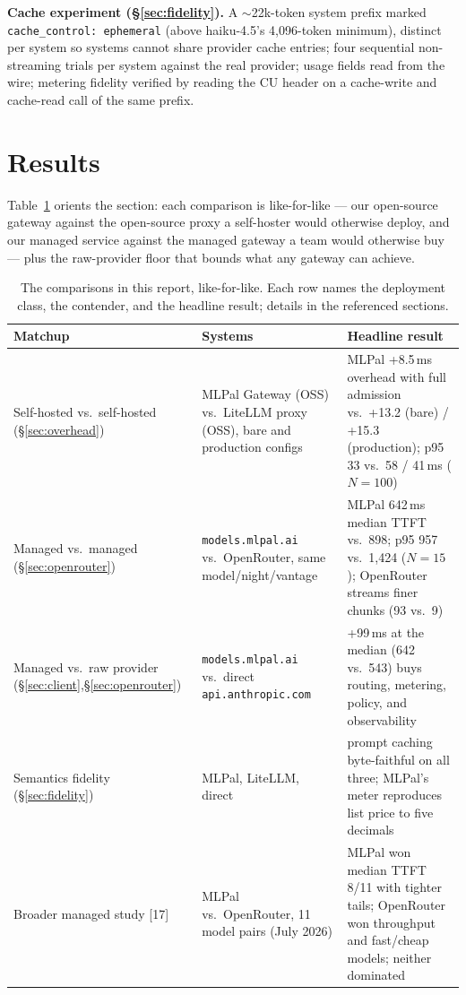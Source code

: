 \documentclass[10pt]{article}
\newcommand{\head}[1]{\textbf{#1}}
\begin{document}
\head{Cache experiment (\S\ref{sec:fidelity}).} A $\sim$22k-token system prefix marked \texttt{cache\_control: ephemeral} (above haiku-4.5's 4{,}096-token minimum), distinct per system so systems cannot share provider cache entries; four sequential non-streaming trials per system against the real provider; usage fields read from the wire; metering fidelity verified by reading the CU header on a cache-write and cache-read call of the same prefix.

\section{Results}
Table~\ref{tab:matchups} orients the section: each comparison is like-for-like --- our open-source gateway against the open-source proxy a self-hoster would otherwise deploy, and our managed service against the managed gateway a team would otherwise buy --- plus the raw-provider floor that bounds what any gateway can achieve.

\begin{table}[t]
\centering\small
\caption{The comparisons in this report, like-for-like. Each row names the deployment class, the contender, and the headline result; details in the referenced sections.}
\label{tab:matchups}
\setlength{\tabcolsep}{4pt}
\begin{tabular}{p{2.9cm}p{3.3cm}p{6.4cm}}
\toprule
Matchup & Systems & Headline result \\
\midrule
Self-hosted vs.\ self-hosted (\S\ref{sec:overhead}) & MLPal Gateway (OSS) vs.\ LiteLLM proxy (OSS), bare and production configs & MLPal +8.5\,ms overhead with full admission vs.\ +13.2 (bare) / +15.3 (production); p95 33 vs.\ 58 / 41\,ms ($N{=}100$) \\[2pt]
Managed vs.\ managed (\S\ref{sec:openrouter}) & \texttt{models.mlpal.ai} vs.\ OpenRouter, same model/night/vantage & MLPal 642\,ms median TTFT vs.\ 898; p95 957 vs.\ 1{,}424 ($N{=}15$); OpenRouter streams finer chunks (93 vs.\ 9) \\[2pt]
Managed vs.\ raw provider (\S\ref{sec:client},\S\ref{sec:openrouter}) & \texttt{models.mlpal.ai} vs.\ direct \texttt{api.anthropic.com} & +99\,ms at the median (642 vs.\ 543) buys routing, metering, policy, and observability \\[2pt]
Semantics fidelity (\S\ref{sec:fidelity}) & MLPal, LiteLLM, direct & prompt caching byte-faithful on all three; MLPal's meter reproduces list price to five decimals \\[2pt]
Broader managed study [17] & MLPal vs.\ OpenRouter, 11 model pairs (July 2026) & MLPal won median TTFT 8/11 with tighter tails; OpenRouter won throughput and fast/cheap models; neither dominated \\
\bottomrule
\end{tabular}
\end{table}
\end{document}
